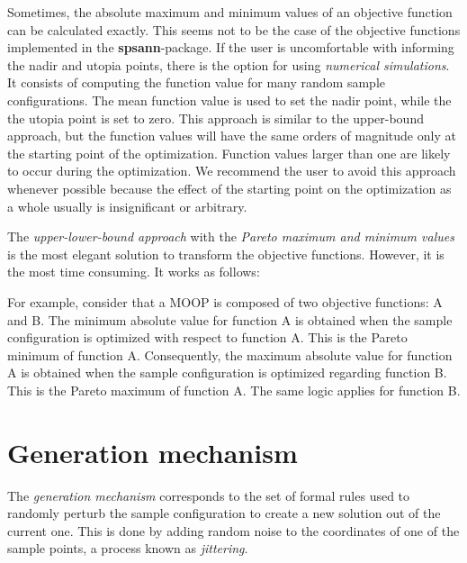 Sometimes, the absolute maximum and minimum values of an objective function 
can be calculated exactly. This seems not to be the case of the objective 
functions implemented in the \textbf{spsann}-package. If the user is 
uncomfortable with informing the nadir and utopia points, there is the option
for using \textit{numerical simulations}. It consists of computing the 
function value for many random sample configurations. The mean function 
value is used to set the nadir point, while the the utopia point is set to
zero. This approach is similar to the upper-bound approach, but the function
values will have the same orders of magnitude only at the starting point of 
the optimization. Function values larger than one are likely to occur during 
the optimization. We recommend the user to avoid this approach whenever 
possible because the effect of the starting point on the optimization as a 
whole usually is insignificant or arbitrary.

The \textit{upper-lower-bound approach} with the \textit{Pareto maximum and 
minimum values} is the most elegant solution to transform the objective 
functions. However, it is the most time consuming. It works as follows:


For example, consider that a MOOP is composed of two objective functions: A 
and B. The minimum absolute value for function A is obtained when the sample
configuration is optimized with respect to function A. This is the Pareto
minimum of function A. Consequently, the maximum absolute value for function
A is obtained when the sample configuration is optimized regarding function
B. This is the Pareto maximum of function A. The same logic applies for 
function B.

\section{Generation mechanism}

The \textit{generation mechanism} corresponds to the set of formal rules used 
to randomly perturb the sample conﬁguration to create a new solution out of the
current one. This is done by adding random noise to the coordinates of one of 
the sample points, a process known as \textit{jittering}.

